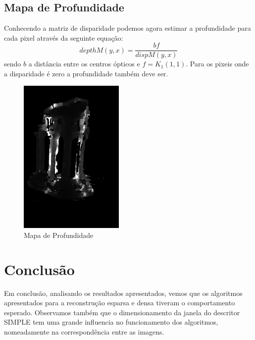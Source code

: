 \documentclass[journal]{IEEEtran}
\begin{document}
\subsection*{Mapa de Profundidade}
\par Conhecendo a matriz de disparidade podemos agora estimar a profundidade para cada pixel através da seguinte equação:
\begin{equation}
    depthM(y,x) = \frac{b f}{dispM(y,x)}
\end{equation}
sendo $b$ a distância entre os centros ópticos e $f=K_1(1,1)$. Para os pixeis onde a disparidade é zero a profundidade também deve ser.
\begin{figure}[H]
    \centering
    \includegraphics[width=2in]{Images/depMap.png}
    \caption{Mapa de Profundidade}
\end{figure}
\section{Conclusão}
\par Em conclusão, analisando os resultados apresentados, vemos que os algoritmos apresentados para a reconstrução esparsa e densa tiveram o comportamento esperado. Observamos também que o dimensionamento da janela do descritor SIMPLE tem uma grande influencia no funcionamento dos algoritmos, nomeadamente na correspondência entre as imagens.
\end{document}
